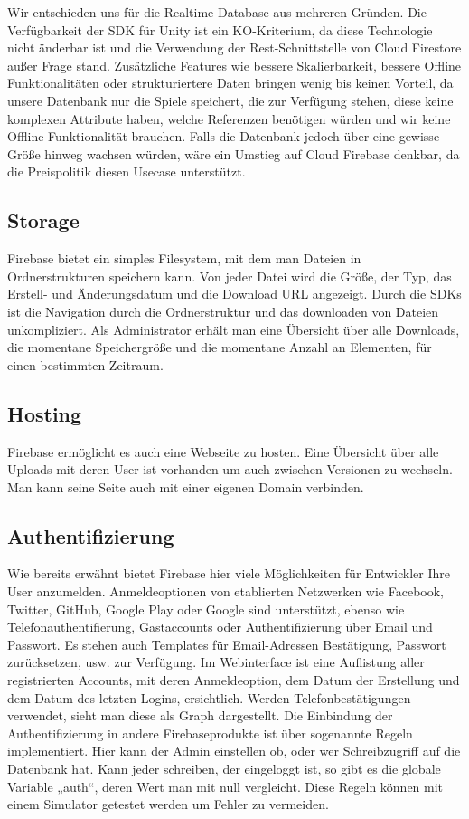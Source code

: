 Wir entschieden uns für die Realtime Database aus mehreren Gründen. Die Verfügbarkeit der SDK für Unity ist ein KO-Kriterium, da diese Technologie nicht änderbar ist und die Verwendung der Rest-Schnittstelle von Cloud Firestore außer Frage stand. Zusätzliche Features wie bessere Skalierbarkeit, bessere Offline Funktionalitäten oder strukturiertere Daten bringen wenig bis keinen Vorteil, da unsere Datenbank nur die Spiele speichert, die zur Verfügung stehen, diese keine komplexen Attribute haben, welche Referenzen benötigen würden und wir keine Offline Funktionalität brauchen. Falls die Datenbank jedoch über eine gewisse Größe hinweg wachsen würden, wäre ein Umstieg auf Cloud Firebase denkbar, da die Preispolitik diesen Usecase unterstützt.
\subsection{Storage}
Firebase bietet ein simples Filesystem, mit dem man Dateien in Ordnerstrukturen speichern kann. Von jeder Datei wird die Größe, der Typ, das Erstell- und Änderungsdatum und die Download URL angezeigt. Durch die SDKs ist die Navigation durch die Ordnerstruktur und das downloaden von Dateien unkompliziert. Als Administrator erhält man eine Übersicht über alle Downloads, die momentane Speichergröße und die momentane Anzahl an Elementen, für einen bestimmten Zeitraum. 
\subsection{Hosting}
Firebase ermöglicht es auch eine Webseite zu hosten. Eine Übersicht über alle Uploads mit deren User ist vorhanden um auch zwischen Versionen zu wechseln. Man kann seine Seite auch mit einer eigenen Domain verbinden.
\subsection{Authentifizierung}
Wie bereits erwähnt bietet Firebase hier viele Möglichkeiten für Entwickler Ihre User anzumelden. Anmeldeoptionen von etablierten Netzwerken wie Facebook, Twitter, GitHub, Google Play oder Google sind unterstützt, ebenso wie Telefonauthentifierung, Gastaccounts oder Authentifizierung über Email und Passwort. Es stehen auch Templates für Email-Adressen Bestätigung, Passwort zurücksetzen, usw. zur Verfügung. 
Im Webinterface ist eine Auflistung aller registrierten Accounts, mit deren Anmeldeoption, dem Datum der Erstellung und dem Datum des letzten Logins, ersichtlich.
Werden Telefonbestätigungen verwendet, sieht man diese als Graph dargestellt. Die Einbindung der Authentifizierung in andere Firebaseprodukte ist über sogenannte Regeln implementiert. Hier kann der Admin einstellen ob, oder wer Schreibzugriff auf die Datenbank hat. Kann jeder schreiben, der eingeloggt ist, so gibt es die globale Variable „auth“, deren Wert man mit null vergleicht. Diese Regeln können mit einem Simulator getestet werden um Fehler zu vermeiden.
